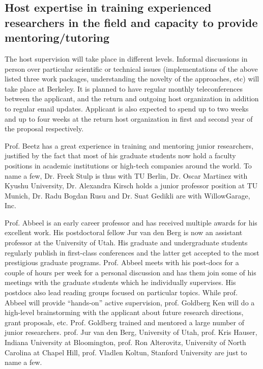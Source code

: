 \subsection{Host expertise in training  experienced researchers in the field and capacity to provide 
mentoring/tutoring} 
The host supervision will take place in different levels. Informal discussions in person over
particular scientific or technical issues (implementations of the above listed three 
work packages, understanding the novelty of the approaches, etc) will take place
at Berkeley. It is planned to have regular monthly teleconferences between the applicant, 
and the return and outgoing host organization in addition to regular email
updates. Applicant is also expected to spend up to two weeks and up to four weeks
at the return host organization in first and second year of the proposal respectively.

Prof. Beetz has a great experience in training and mentoring junior researchers, justified 
by the fact that most of his graduate students now hold a faculty positions in academic 
institutions or high-tech companies around the world. To name a few, Dr. Freek Stulp is thus with TU Berlin, 
Dr. Oscar Martinez with Kyushu University, Dr. Alexandra Kirsch holds a junior professor position at 
TU Munich, Dr. Radu Bogdan Rusu and Dr. Suat Gedikli are with WillowGarage, Inc.

Prof. Abbeel is an early career professor and has received multiple awards for his excellent work.
His postdoctoral fellow Jur van den Berg is now an assistant professor at the University of Utah.
His graduate and undergraduate students regularly publish in first-class conferences and the latter
get accepted to the most prestigious graduate programs. Prof. Abbeel meets with his post-docs for 
a couple of hours per week for a personal discussion and has them join some of his meetings with 
the graduate students which he individually supervises. His postdocs also lead reading groups
focused on particular topics. While prof. Abbeel will provide ``hands-on''
active supervision, prof. Goldberg Ken will do a high-level brainstorming with the applicant about 
future research directions, grant proposals, etc. Prof. Goldberg trained and mentored a large number
of junior researchers. prof. Jur van den Berg, University of Utah, prof. Kris Hauser, Indiana University at Bloomington, 
prof. Ron Alterovitz, University of North Carolina at Chapel Hill, prof.  Vladlen Koltun, Stanford University
are just to name a few.

